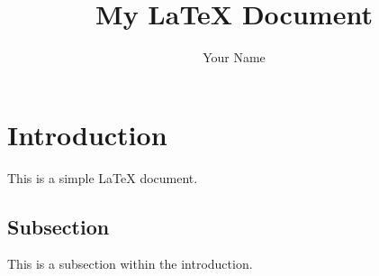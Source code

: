 \documentclass{article}
\title{My LaTeX Document}
\author{Your Name}
\begin{document}
\maketitle

\section{Introduction}
This is a simple LaTeX document.

\subsection{Subsection}
This is a subsection within the introduction.

\begin{changelog}
\end{changelog}
\end{document}

